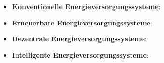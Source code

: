 \begin{itemize}
    \item \textbf{Konventionelle Energieversorgungssysteme}: 
            
    \item \textbf{Erneuerbare Energieversorgungssysteme}: 
        
    \item \textbf{Dezentrale Energieversorgungssysteme}: 
        
    \item \textbf{Intelligente Energieversorgungssysteme}: 
        
\end{itemize}